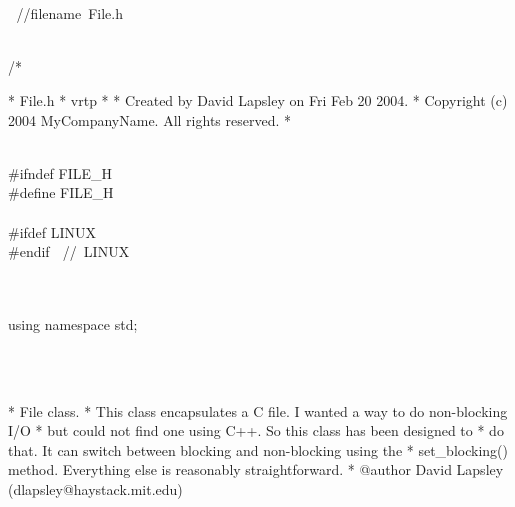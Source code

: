\documentclass{article}
\begin{document}
\pagebreak
\sloppy
\strut\\
\strut\goodbreak
{}\strut\nopagebreak\\
 
\hbox{//$$filename File.h}\strut\\
\hbox{/*}

 *  File.h
 *  vrtp
 *
 *  Created by David Lapsley on Fri Feb 20 2004.
 *  Copyright (c) 2004 MyCompanyName. All rights reserved.
 *
 \strut\goodbreak
{}\strut\nopagebreak\\
 #ifndef FILE_H
\\
 #define FILE_H
\\
 
\\
 #ifdef LINUX
\\
 #endif 
\hbox{// LINUX}\strut\\
 
\\
 using namespace std;
\strut\\\strut\\* File class.
  * This class encapsulates a C file. I wanted a way to do non-blocking I/O
  * but could not find one using C++. So this class has been designed to
  * do that. It can switch between blocking and non-blocking using the
  * set_blocking() method. Everything else is reasonably straightforward.
  * @author David Lapsley (dlapsley@haystack.mit.edu)
  \strut\goodbreak
{}\strut\nopagebreak\\
\end{document}
